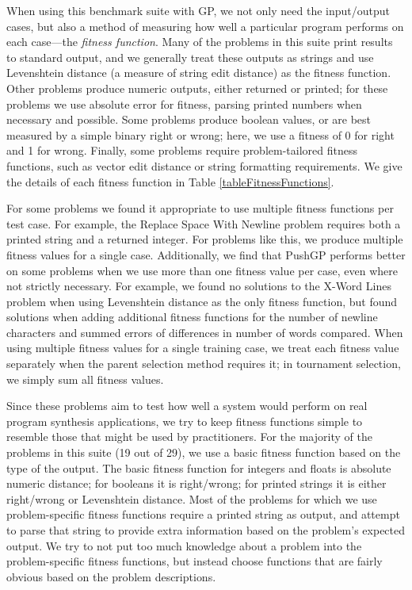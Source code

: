 \documentclass{sig-alternate}
\begin{document}
When using this benchmark suite with GP, we not only need the input/output cases, but also a method of measuring how well a particular program performs on each case---the \textit{fitness function}. 
Many of the problems in this suite print results to standard output, and we generally treat these outputs as strings and use Levenshtein distance (a measure of string edit distance) as the fitness function. Other problems produce numeric outputs, either returned or printed; for these problems we use absolute error for fitness, parsing printed numbers when necessary and possible. Some problems produce boolean values, or are best measured by a simple binary right or wrong; here, we use a fitness of 0 for right and 1 for wrong. Finally, some problems require problem-tailored fitness functions, such as vector edit distance or string formatting requirements. We give the details of each fitness function in Table \ref{tableFitnessFunctions}.

For some problems we found it appropriate to use multiple fitness functions per test case. For example, the Replace Space With Newline problem requires both a printed string and a returned integer. For problems like this, we produce multiple fitness values for a single case. Additionally, we find that PushGP performs better on some problems when we use more than one fitness value per case, even where not strictly necessary. For example, we found no solutions to the X-Word Lines problem when using Levenshtein distance as the only fitness function, but found solutions when adding additional fitness functions for the number of newline characters and summed errors of differences in number of words compared. When using multiple fitness values for a single training case, we treat each fitness value separately when the parent selection method requires it; in tournament selection, we simply sum all fitness values.

Since these problems aim to test how well a system would perform on real program synthesis applications, we try to keep fitness functions simple to resemble those that might be used by practitioners. For the majority of the problems in this suite (19 out of 29), we use a basic fitness function based on the type of the output. The basic fitness function for integers and floats is absolute numeric distance; for booleans it is right/wrong; for printed strings it is either right/wrong or Levenshtein distance. Most of the problems for which we use problem-specific fitness functions require a printed string as output, and attempt to parse that string to provide extra information based on the problem's expected output. We try to not put too much knowledge about a problem into the problem-specific fitness functions, but instead choose functions that are fairly obvious based on the problem descriptions.
\end{document}
